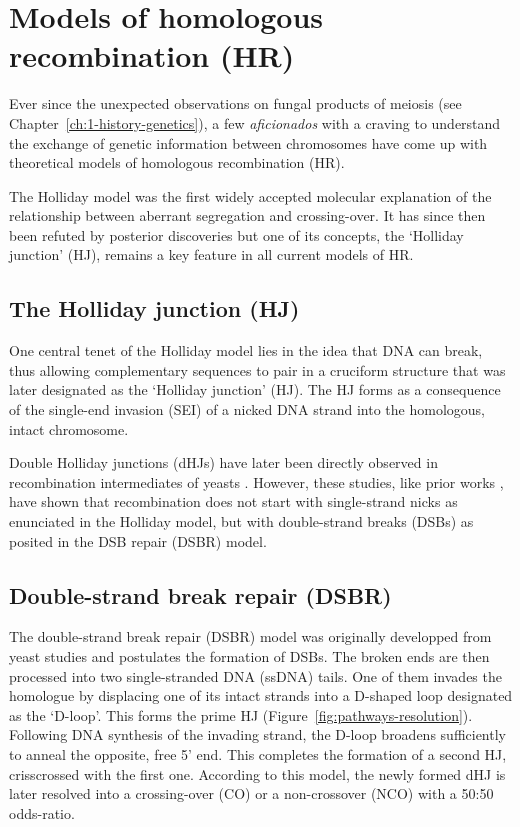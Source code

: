 \section{Models of homologous recombination (HR)}

Ever since the unexpected observations on fungal products of meiosis (see Chapter~\ref{ch:1-history-genetics}), a few \textit{aficionados} with a craving to understand the exchange of genetic information between chromosomes have come up with theoretical models of homologous recombination (HR).

The Holliday model \citep{holliday1964mechanism} was the first widely accepted molecular explanation of the relationship between aberrant segregation and crossing-over. 
It has since then been refuted by posterior discoveries but one of its concepts, the ‘Holliday junction’ (HJ), remains a key feature in all current models of HR\@.


\subsection{The Holliday junction (HJ)}

One central tenet of the Holliday model lies in the idea that DNA can break, thus allowing complementary sequences to pair in a cruciform structure that was later designated as the ‘Holliday junction’ (HJ).
The HJ forms as a consequence of the single-end invasion (SEI) of a nicked DNA strand into the homologous, intact chromosome.

Double Holliday junctions (dHJs) have later been directly observed in recombination intermediates of yeasts \citep{schwacha1994identification, schwacha1995identification}.
However, these studies, like prior works \citep{sun1989double,cao1990pathway}, have shown that recombination does not start with single-strand nicks as enunciated in the Holliday model, but with double-strand breaks (DSBs) as posited in the DSB repair (DSBR) model.


\subsection{Double-strand break repair (DSBR)}

The double-strand break repair (DSBR) model \citep{szostak1983doublestrandbreak} was originally developped from yeast studies \citep{orr-weaver1981yeast, orr-weaver1983yeast} and postulates the formation of DSBs. 
The broken ends are then processed into two single-stranded DNA (ssDNA) tails. 
One of them invades the homologue by displacing one of its intact strands into a D-shaped loop designated as the ‘D-loop’. This forms the prime HJ (Figure~\ref{fig:pathways-resolution}).
Following DNA synthesis of the invading strand, the D-loop broadens sufficiently to anneal the opposite, free 5’ end.
This completes the formation of a second HJ, crisscrossed with the first one.
According to this model, the newly formed dHJ is later resolved into a crossing-over (CO) or a non-crossover (NCO) with a 50:50 odds-ratio.

